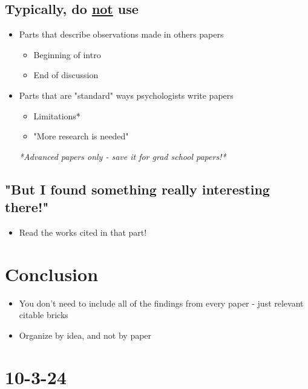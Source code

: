 \documentclass{report}
\begin{document}
\subsection{Typically, do \underline{not} use}
\begin{itemize}
    \item Parts that describe observations made in others papers
    \begin{itemize}
        \item Beginning of intro    
        \item End of discussion
    \end{itemize}
    \item Parts that are "standard" ways psychologists write papers
    \begin{itemize}
        \item Limitations* 
        \item "More research is needed"
    \end{itemize}
    \textit{*Advanced papers only - save it for grad school papers!*}
\end{itemize}

\vspace{10pt}

\subsection{"But I found something really interesting there!"}
\begin{itemize}
    \item Read the works cited in that part!
\end{itemize}

\vspace{10pt}

\section{Conclusion}
\begin{itemize}
    \item You don't need to include all of the findings from every paper - just relevant citable bricks
    \item Organize by idea, and not by paper
\end{itemize}

\section{10-3-24}
\end{document}
